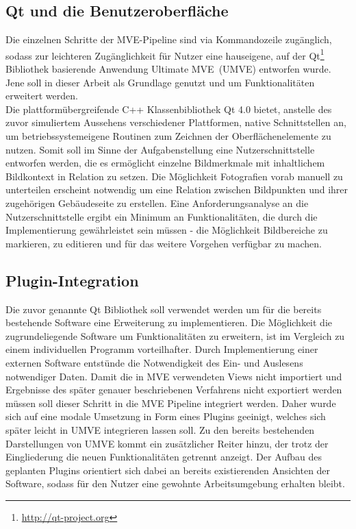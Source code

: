 \subsection{Qt und die Benutzeroberfl\"ache}
Die einzelnen Schritte der MVE-Pipeline sind via Kommandozeile zug\"anglich, sodass zur leichteren Zug\"anglichkeit f\"ur Nutzer eine hauseigene, auf der Qt\footnote{\url{http://qt-project.org}} Bibliothek basierende Anwendung \glqq Ultimate MVE\grqq \ (UMVE) entworfen wurde. Jene soll in dieser Arbeit als Grundlage genutzt und um Funktionalit\"aten erweitert werden.\\
Die plattform\"ubergreifende C++ Klassenbibliothek Qt 4.0 bietet, anstelle des zuvor simuliertem Aussehens verschiedener Plattformen, native Schnittstellen an, um betriebssystemeigene Routinen zum Zeichnen der Oberfl\"achenelemente zu nutzen. Somit soll im Sinne der Aufgabenstellung eine Nutzerschnittstelle entworfen werden, die es erm\"oglicht einzelne Bildmerkmale mit inhaltlichem Bildkontext in Relation zu setzen. Die M\"oglichkeit Fotografien vorab manuell zu unterteilen erscheint notwendig um eine Relation zwischen Bildpunkten und ihrer zugeh\"origen Geb\"audeseite zu erstellen. Eine Anforderungsanalyse an die Nutzerschnittstelle ergibt ein Minimum an Funktionalit\"aten, die durch die Implementierung gew\"ahrleistet sein m\"ussen - die M\"oglichkeit Bildbereiche zu markieren, zu editieren und f\"ur das weitere Vorgehen verf\"ugbar zu machen. 


\subsection{Plugin-Integration}

Die zuvor genannte Qt Bibliothek soll verwendet werden um f\"ur die bereits bestehende Software eine Erweiterung zu implementieren. Die M\"oglichkeit die zugrundeliegende Software um Funktionalit\"aten zu erweitern, ist im Vergleich zu einem individuellen Programm vorteilhafter. Durch Implementierung einer externen Software entst\"unde die Notwendigkeit des Ein- und Auslesens notwendiger Daten. Damit die in MVE verwendeten Views nicht importiert und Ergebnisse des sp\"ater genauer beschriebenen Verfahrens nicht exportiert werden m\"ussen soll dieser Schritt in die MVE Pipeline integriert werden. Daher wurde sich auf eine modale Umsetzung in Form eines Plugins geeinigt, welches sich sp\"ater leicht in UMVE integrieren lassen soll. Zu den bereits bestehenden Darstellungen von UMVE kommt ein zus\"atzlicher Reiter hinzu, der trotz der Eingliederung die neuen Funktionalit\"aten getrennt anzeigt. Der Aufbau des geplanten Plugins orientiert sich dabei an bereits existierenden Ansichten der Software, sodass f\"ur den Nutzer eine gewohnte Arbeitsumgebung erhalten bleibt. 